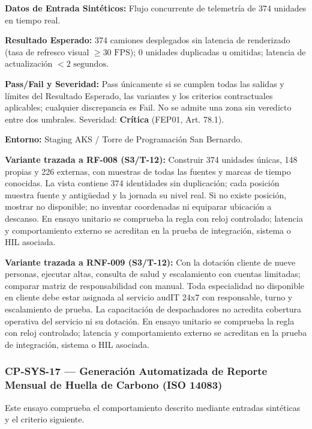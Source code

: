 \par\noindent\textbf{Datos de Entrada Sintéticos:} Flujo concurrente de telemetría de 374 unidades en tiempo real.\par
\par\noindent\textbf{Resultado Esperado:} 374 camiones desplegados sin latencia de renderizado (tasa de refresco visual \(\ge 30\text{ FPS}\)); 0 unidades duplicadas u omitidas; latencia de actualización \(< 2\text{ segundos}\).\par
\par\noindent\textbf{Pass/Fail y Severidad:} Pass únicamente si se cumplen todas las salidas y límites del Resultado Esperado, las variantes y los criterios contractuales aplicables; cualquier discrepancia es Fail. No se admite una zona sin veredicto entre dos umbrales. Severidad: \textbf{Crítica} (FEP01, Art. 78.1).\par
\par\noindent\textbf{Entorno:} Staging AKS / Torre de Programación San Bernardo.\par

\par\noindent\textbf{Variante trazada a RF-008 (S3/T-12):} Construir 374 unidades únicas, 148 propias y 226 externas, con muestras de todas las fuentes y marcas de tiempo conocidas. La vista contiene 374 identidades sin duplicación; cada posición muestra fuente y antigüedad y la jornada su nivel real. Si no existe posición, mostrar no disponible; no inventar coordenadas ni equiparar ubicación a descanso. En ensayo unitario se comprueba la regla con reloj controlado; latencia y comportamiento externo se acreditan en la prueba de integración, sistema o HIL asociada.\par

\par\noindent\textbf{Variante trazada a RNF-009 (S3/T-12):} Con la dotación cliente de nueve personas, ejecutar altas, consulta de salud y escalamiento con cuentas limitadas; comparar matriz de responsabilidad con manual. Toda especialidad no disponible en cliente debe estar asignada al servicio audIT 24x7 con responsable, turno y escalamiento de prueba. La capacitación de despachadores no acredita cobertura operativa del servicio ni su dotación. En ensayo unitario se comprueba la regla con reloj controlado; latencia y comportamiento externo se acreditan en la prueba de integración, sistema o HIL asociada.\par


\subsubsection*{CP-SYS-17 — Generación Automatizada de Reporte Mensual de Huella de Carbono (ISO 14083)}\label{sec:9-cp-sys-17}
Este ensayo comprueba el comportamiento descrito mediante entradas sintéticas y el criterio siguiente.

